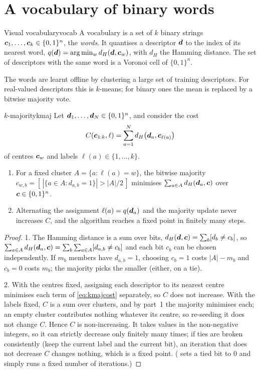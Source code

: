 \section{A vocabulary of binary words}

\begin{definition}{Visual vocabulary}{vocab}
A vocabulary is a set of $k$ binary strings $\bm{c}_1,\dots,
\bm{c}_k\in\{0,1\}^n$, the \emph{words}. It quantises a descriptor
$\bm{d}$ to the index of its nearest word, $q(\bm{d})=
\arg\min_w d_H(\bm{d},\bm{c}_w)$, with $d_H$ the Hamming distance.
The set of descriptors with the same word is a Voronoi cell of
$\{0,1\}^n$.
\end{definition}

The words are learnt offline by clustering a large set of training
descriptors. For real-valued descriptors this is $k$-means; for binary
ones the mean is replaced by a bitwise majority vote.

\begin{proposition}{$k$-majority}{kmaj}
Let $\bm{d}_1,\dots,\bm{d}_N\in\{0,1\}^n$, and consider the cost
\begin{equation}\label{eq:kmajcost}
C(\bm{c}_{1:k},\ell)=\sum_{a=1}^N d_H\bigl(\bm{d}_a,
\bm{c}_{\ell(a)}\bigr)
\end{equation}
of centres $\bm{c}_w$ and labels $\ell(a)\in\{1,\dots,k\}$.
\begin{enumerate}[nosep]
\item For a fixed cluster $A=\{a:\ell(a)=w\}$, the bitwise majority
  $c_{w,b}=[\,|\{a\in A:d_{a,b}=1\}|>|A|/2\,]$ minimises $\sum_{a\in A}
  d_H(\bm{d}_a,\bm{c})$ over $\bm{c}\in\{0,1\}^n$.
\item Alternating the assignment $\ell(a)=q(\bm{d}_a)$ and the
  majority update never increases $C$, and the algorithm reaches a
  fixed point in finitely many steps.
\end{enumerate}
\end{proposition}

\begin{proof}
1. The Hamming distance is a sum over bits, $d_H(\bm{d},\bm{c})=
\sum_b[d_b\neq c_b]$, so $\sum_{a\in A}d_H(\bm{d}_a,\bm{c})=
\sum_b\sum_{a\in A}[d_{a,b}\neq c_b]$ and each bit $c_b$ can be chosen
independently. If $m_b$ members have $d_{a,b}=1$, choosing $c_b=1$
costs $|A|-m_b$ and $c_b=0$ costs $m_b$; the majority picks the
smaller (either, on a tie).

2. With the centres fixed, assigning each descriptor to its nearest
centre minimises each term of \eqref{eq:kmajcost} separately, so $C$
does not increase. With the labels fixed, $C$ is a sum over clusters,
and by part~1 the majority minimises each; an empty cluster contributes
nothing whatever its centre, so re-seeding it does not change $C$.
Hence $C$ is non-increasing. It takes values in the non-negative
integers, so it can strictly decrease only finitely many times;
if ties are broken consistently (keep the current label and the current
bit), an iteration that does not decrease $C$ changes nothing, which is
a fixed point. ( sets a tied bit to $0$ and simply
runs a fixed number of iterations.)
\end{proof}

